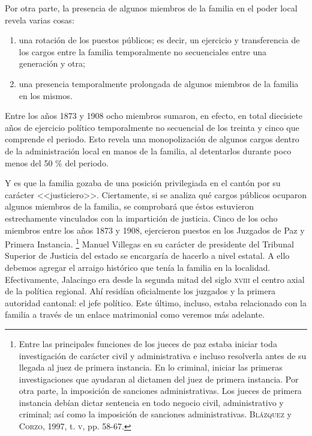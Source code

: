 \documentclass[14pt,twoside,final]{extbook} %
\let\oldfootnote\footnote
\renewcommand\footnote[1]{%
\oldfootnote{\hspace{1mm}#1}}
\begin{document}
Por otra parte, la presencia de algunos miembros de la familia en el poder local revela varias cosas:
\begin{enumerate}[noitemsep]
\item una rotación de los puestos públicos; es decir, un ejercicio y transferencia de los cargos entre la familia temporalmente no secuenciales entre una generación y otra; 
\item una presencia temporalmente prolongada de algunos miembros de la familia en los mismos.
\end{enumerate}
Entre los años 1873 y 1908 ocho miembros sumaron, en efecto, en total diecisiete años de ejercicio político temporalmente no secuencial de los treinta y cinco que comprende el periodo. Esto revela una monopolización de algunos cargos dentro de la administración local en manos de la familia, al detentarlos durante poco menos del 50 \% del periodo.

Y es que la familia gozaba de una posición privilegiada en el cantón por su carácter <<justiciero>>. Ciertamente, si se analiza qué cargos públicos ocuparon algunos miembros de la familia, se comprobará que éstos estuvieron estrechamente vinculados con la impartición de justicia. Cinco de los ocho miembros entre los años 1873 y 1908, ejercieron puestos en los Juzgados de Paz y Primera Instancia.\footnote{Entre las principales funciones de los jueces de paz estaba iniciar toda investigación de carácter civil y administrativa e incluso resolverla antes de su llegada al juez de primera instancia. En lo criminal, iniciar las primeras investigaciones que ayudaran al dictamen del juez de primera instancia. Por otra parte, la imposición de sanciones administrativas. Los jueces de primera instancia debían dictar sentencia en todo negocio civil, administrativo y criminal; así como la imposición de sanciones administrativas. \textsc{Blázquez} y \textsc{Corzo}, 1997, t. \textsc{v}, pp. 58-67.} Manuel Villegas en su carácter de presidente del Tribunal Superior de Justicia del estado se encargaría de hacerlo a nivel estatal. A ello debemos agregar el arraigo histórico que tenía la familia en la localidad. Efectivamente, Jalacingo era desde la segunda mitad del siglo \textsc{xviii} el centro axial de la política regional. Ahí residían oficialmente los juzgados y la primera autoridad cantonal: el jefe político. Este último, incluso, estaba relacionado con la familia a través de un enlace matrimonial como veremos más adelante.
\end{document}
